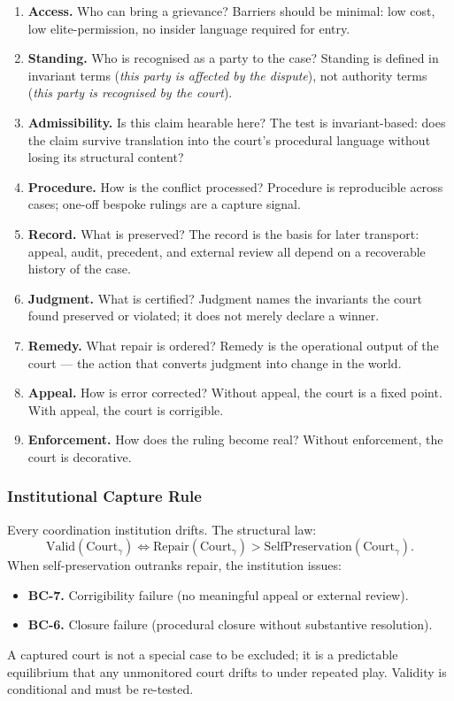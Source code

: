\documentclass[
]{article}
\providecommand{\tightlist}{%
  \setlength{\itemsep}{0pt}\setlength{\parskip}{0pt}}
\begin{document}
\begin{enumerate}
\def\labelenumi{\arabic{enumi}.}
\tightlist
\item
  \textbf{Access.} Who can bring a grievance? Barriers should be
  minimal: low cost, low elite-permission, no insider language
  required for entry.
\item
  \textbf{Standing.} Who is recognised as a party to the case?
  Standing is defined in invariant terms (\emph{this party is
  affected by the dispute}), not authority terms (\emph{this
  party is recognised by the court}).
\item
  \textbf{Admissibility.} Is this claim hearable here? The test
  is invariant-based: does the claim survive translation into
  the court's procedural language without losing its structural
  content?
\item
  \textbf{Procedure.} How is the conflict processed? Procedure is
  reproducible across cases; one-off bespoke rulings are a
  capture signal.
\item
  \textbf{Record.} What is preserved? The record is the basis for
  later transport: appeal, audit, precedent, and external review
  all depend on a recoverable history of the case.
\item
  \textbf{Judgment.} What is certified? Judgment names the
  invariants the court found preserved or violated; it does not
  merely declare a winner.
\item
  \textbf{Remedy.} What repair is ordered? Remedy is the
  operational output of the court --- the action that converts
  judgment into change in the world.
\item
  \textbf{Appeal.} How is error corrected? Without appeal, the
  court is a fixed point. With appeal, the court is corrigible.
\item
  \textbf{Enforcement.} How does the ruling become real? Without
  enforcement, the court is decorative.
\end{enumerate}

\subsubsection*{Institutional Capture Rule}

Every coordination institution drifts. The structural law:
\[
  \mathrm{Valid}(\mathrm{Court}_\gamma)
  \iff
  \mathrm{Repair}(\mathrm{Court}_\gamma) >
  \mathrm{SelfPreservation}(\mathrm{Court}_\gamma).
\]
When self-preservation outranks repair, the institution issues:
\begin{itemize}
\tightlist
\item
  \textbf{BC-7.} Corrigibility failure (no meaningful appeal or
  external review).
\item
  \textbf{BC-6.} Closure failure (procedural closure without
  substantive resolution).
\end{itemize}
A captured court is not a special case to be excluded; it is a
predictable equilibrium that any unmonitored court drifts to under
repeated play. Validity is conditional and must be re-tested.
\end{document}
